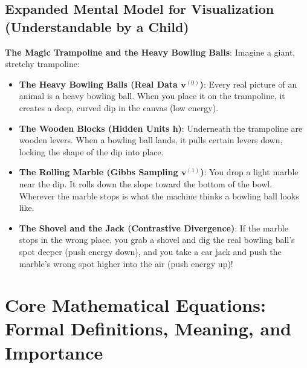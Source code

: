 \documentclass[11pt,a4paper]{article}
\theoremstyle{definition}
\begin{document}
\subsection{Expanded Mental Model for Visualization (Understandable by a Child)}
\textbf{The Magic Trampoline and the Heavy Bowling Balls}:
Imagine a giant, stretchy trampoline:
\begin{itemize}
    \item \textbf{The Heavy Bowling Balls (Real Data $\mathbf{v}^{(0)}$)}:
    Every real picture of an animal is a heavy bowling ball. When you place it on the trampoline, it creates a deep, curved dip in the canvas (low energy).
    
    \item \textbf{The Wooden Blocks (Hidden Units $\mathbf{h}$)}:
    Underneath the trampoline are wooden levers. When a bowling ball lands, it pulls certain levers down, locking the shape of the dip into place.
    
    \item \textbf{The Rolling Marble (Gibbs Sampling $\mathbf{v}^{(1)}$)}:
    You drop a light marble near the dip. It rolls down the slope toward the bottom of the bowl. Wherever the marble stops is what the machine thinks a bowling ball looks like.
    
    \item \textbf{The Shovel and the Jack (Contrastive Divergence)}:
    If the marble stops in the wrong place, you grab a shovel and dig the real bowling ball's spot deeper (push energy down), and you take a car jack and push the marble's wrong spot higher into the air (push energy up)!
\end{itemize}

\section{Core Mathematical Equations: Formal Definitions, Meaning, and Importance}
\end{document}
